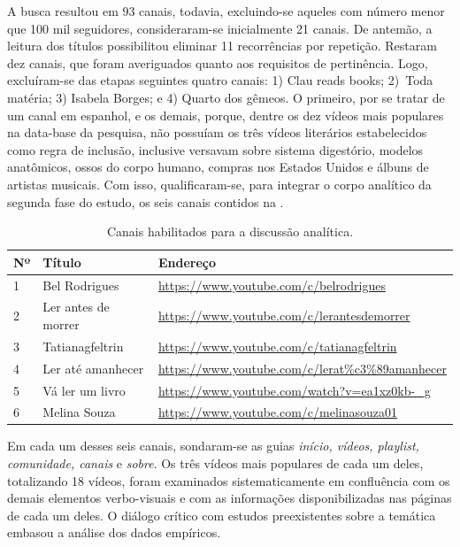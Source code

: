 \documentclass[portuguese]{textolivre}
\begin{document}
A busca resultou em 93 canais, todavia, excluindo-se aqueles com número
menor que 100 mil seguidores, consideraram-se inicialmente 21 canais. De
antemão, a leitura dos títulos possibilitou eliminar 11 recorrências por
repetição. Restaram dez canais, que foram averiguados quanto aos
requisitos de pertinência. Logo, excluíram-se das etapas seguintes
quatro canais: 1) Clau reads books; 2)~Toda matéria; 3) Isabela Borges;
e 4) Quarto dos gêmeos. O primeiro, por se tratar de um canal em
espanhol, e os demais, porque, dentre os dez vídeos mais populares na
data-base da pesquisa, não possuíam os três vídeos literários
estabelecidos como regra de inclusão, inclusive versavam sobre sistema
digestório, modelos anatômicos, ossos do corpo humano, compras nos
Estados Unidos e álbuns de artistas musicais. Com isso, qualificaram-se,
para integrar o corpo analítico da segunda fase do estudo, os seis
canais contidos na .

\begin{table}[htpb]
\centering
\small
\begin{threeparttable}
\caption{Canais habilitados para a discussão analítica.}
\label{tbl02}
\begin{tabular}{lll}
\toprule
Nº & Título & Endereço \\
\midrule
1 & Bel Rodrigues & \url{https://www.youtube.com/c/belrodrigues} \\
2 & Ler antes de morrer & \url{https://www.youtube.com/c/lerantesdemorrer} \\
3 & Tatianagfeltrin & \url{https://www.youtube.com/c/tatianagfeltrin} \\
4 & Ler até amanhecer & \url{https://www.youtube.com/c/lerat\%c3\%89amanhecer} \\
5 & Vá ler um livro & \url{https://www.youtube.com/watch?v=ea1xz0kb-_g} \\
6 & Melina Souza & \url{https://www.youtube.com/c/melinasouza01} \\
\bottomrule
\end{tabular}
\end{threeparttable}
\end{table}

Em cada um desses seis canais, sondaram-se as guias \emph{início,
vídeos, playlist, comunidade, canais} e \emph{sobre}. Os três vídeos
mais populares de cada um deles, totalizando 18 vídeos, foram examinados
sistematicamente em confluência com os demais elementos verbo-visuais e
com as informações disponibilizadas nas páginas de cada um deles. O
diálogo crítico com estudos preexistentes sobre a temática embasou a
análise dos dados empíricos.
\end{document}
